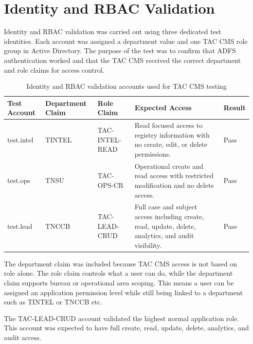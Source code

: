 \raggedright

\section{Identity and RBAC Validation}

Identity and RBAC validation was carried out using three dedicated test identities. Each account was assigned a department value and one TAC CMS role group in Active Directory. The purpose of the test was to confirm that ADFS authentication worked and that the TAC CMS received the correct department and role claims for access control.

\begin{table}[H]
\centering
\small
\renewcommand{\arraystretch}{1.25}
\begin{tabular}{|>{\raggedright\arraybackslash}p{2.7cm}|>{\raggedright\arraybackslash}p{2.5cm}|>{\raggedright\arraybackslash}p{3cm}|>{\raggedright\arraybackslash}p{4.2cm}|>{\centering\arraybackslash}p{1.4cm}|}
\hline
\textbf{Test Account} & \textbf{Department Claim} & \textbf{Role Claim} & \textbf{Expected Access} & \textbf{Result} \\
\hline
test.intel & TINTEL & TAC-INTEL-READ & Read focused access to registry information with no create, edit, or delete permissions. & Pass \\
\hline
test.ops & TNSU & TAC-OPS-CR & Operational create and read access with restricted modification and no delete access. & Pass \\
\hline
test.lead & TNCCB & TAC-LEAD-CRUD & Full case and subject access including create, read, update, delete, analytics, and audit visibility. & Pass \\
\hline
\end{tabular}
\caption{Identity and RBAC validation accounts used for TAC CMS testing}
\label{tab:identity-rbac-validation-accounts}
\end{table}

The department claim was included because TAC CMS access is not based on role alone. The role claim controls what a user can do, while the department claim supports bureau or operational area scoping. This means a user can be assigned an application permission level while still being linked to a department such as TINTEL or TNCCB etc.



The TAC-LEAD-CRUD account validated the highest normal application role. This account was expected to have full create, read, update, delete, analytics, and audit access.

